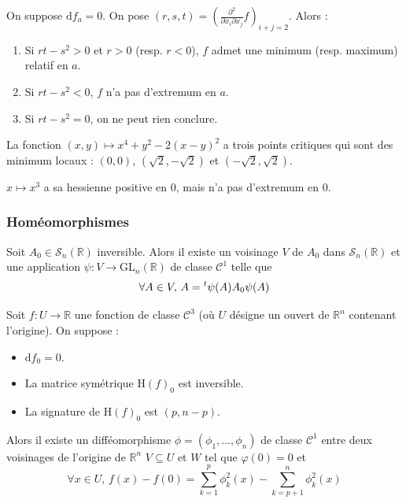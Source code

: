   \begin{example}
    On suppose $\mathrm{d}f_a = 0$. On pose $(r,s,t) = \left(  \frac{\partial^2}{\partial x_i \partial x_j} f \right)_{i+j=2}$. Alors :
    \begin{enumerate}[label={\bfseries(\roman*)}]
      \item Si $rt-s^2 > 0$ et $r > 0$ (resp. $r < 0$), $f$ admet une minimum (resp. maximum) relatif en $a$.
      \item Si $rt-s^2 < 0$, $f$ n'a pas d'extremum en $a$.
      \item Si $rt-s^2 = 0$, on ne peut rien conclure.
    \end{enumerate}
  \end{example}

  \begin{example}
    La fonction $(x,y) \mapsto x^4 + y^2 - 2(x-y)^2$ a trois points critiques qui sont des minimum locaux : $(0,0)$, $(\sqrt{2},-\sqrt{2})$ et $(-\sqrt{2},\sqrt{2})$.
  \end{example}

  \begin{cexample}
    $x \mapsto x^3$ a sa hessienne positive en $0$, mais n'a pas d'extremum en $0$.
  \end{cexample}

  \subsubsection{Homéomorphismes}


  \begin{lemma}
    Soit $A_0 \in \mathcal{S}_n(\mathbb{R})$ inversible. Alors il existe un voisinage $V$ de $A_0$ dans $\mathcal{S}_n(\mathbb{R})$ et une application $\psi : V \rightarrow \mathrm{GL}_n(\mathbb{R})$ de classe $\mathcal{C}^1$ telle que
    \[ \forall A \in V, \, A = \mathstrut ^t \psi(A) A_0 \psi(A) \]
  \end{lemma}


  \begin{lemma}
    Soit $f : U \rightarrow \mathbb{R}$ une fonction de classe $\mathcal{C}^3$ (où $U$ désigne un ouvert de $\mathbb{R}^n$ contenant l'origine). On suppose :
    \begin{itemize}
      \item $\mathrm{d} f_0 = 0$.
      \item La matrice symétrique $\mathrm{H} (f)_0$ est inversible.
      \item La signature de $\mathrm{H}(f)_0$ est $(p, n-p)$.
    \end{itemize}
    Alors il existe un difféomorphisme $\phi = (\phi_1, \dots, \phi_n)$ de classe $\mathcal{C}^1$ entre deux voisinages de l'origine de $\mathbb{R}^n$ $V \subseteq U$ et $W$ tel que $\varphi(0) = 0$ et
    \[ \forall x \in U, \, f(x) - f(0) = \sum_{k=1}^p \phi_k^2(x) - \sum_{k=p+1}^n \phi_k^2(x) \]
  \end{lemma}

